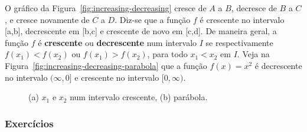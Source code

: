 O gráfico da Figura~\ref{fig:increasing-decreasing} cresce de $A$ a $B$, decresce de $B$ a $C$, e cresce novamente de $C$ a $D$. Diz-se que a função $f$ é crescente no intervalo [a,b], decrescente em [b,c] e crescente de novo em [c,d]. De maneira geral, a função $f$ é \textbf{crescente} ou \textbf{decrescente} num intervalo $I$ se respectivamente $f(x_1) < f(x_2)$ ou $f(x_1) > f(x_2)$, para todo $x_1 < x_2$ em $I$. Veja na Figura~\ref{fig:increasing-decreasing-parabola} que a função $f(x) = x^2$ é decrescente no intervalo $(\infty, 0]$ e crescente no intervalo $[0,\infty)$.
\vspace{-0.5cm}\begin{figure}[!ht]
  \centering
  \caption{(a) $x_1$ e $x_2$ num intervalo crescente, (b) parábola.}
  \vspace{-0.5cm}
\end{figure}

\subsubsection{Exercícios}

